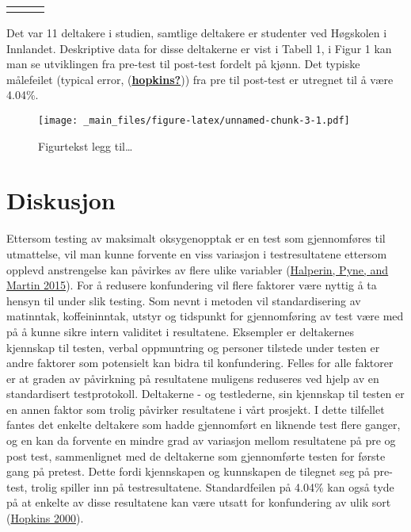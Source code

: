 \documentclass[
]{book}
\begin{document}
\begin{longtable}[c]{|p{1.08in}|p{1.02in}|p{1.02in}}
\noalign{\global\setlength{\arrayrulewidth}{2pt}}\arrayrulecolor[HTML]{666666}\cline{1-3}



\end{longtable}

Det var 11 deltakere i studien, samtlige deltakere er studenter ved
Høgskolen i Innlandet. Deskriptive data for disse deltakerne er vist i
Tabell 1, i Figur 1 kan man se utviklingen fra pre-test til post-test
fordelt på kjønn. Det typiske målefeilet (typical error,
(\protect\hyperlink{ref-hopkins}{\textbf{hopkins?}})) fra pre til
post-test er utregnet til å være 4.04\%.

\begin{figure}
\centering
\texttt{[image: \_main\_files/figure-latex/unnamed-chunk-3-1.pdf]}
\caption{Figurtekst legg til\ldots{}}
\end{figure}

\hypertarget{diskusjon}{%
\section{Diskusjon}\label{diskusjon}}

Ettersom testing av maksimalt oksygenopptak er en test som gjennomføres
til utmattelse, vil man kunne forvente en viss variasjon i
testresultatene ettersom opplevd anstrengelse kan påvirkes av flere
ulike variabler (\protect\hyperlink{ref-halperin2015}{Halperin, Pyne,
and Martin 2015}). For å redusere konfundering vil flere faktorer være
nyttig å ta hensyn til under slik testing. Som nevnt i metoden vil
standardisering av matinntak, koffeininntak, utstyr og tidspunkt for
gjennomføring av test være med på å kunne sikre intern validitet i
resultatene. Eksempler er deltakernes kjennskap til testen, verbal
oppmuntring og personer tilstede under testen er andre faktorer som
potensielt kan bidra til konfundering. Felles for alle faktorer er at
graden av påvirkning på resultatene muligens reduseres ved hjelp av en
standardisert testprotokoll. Deltakerne - og testlederne, sin kjennskap
til testen er en annen faktor som trolig påvirker resultatene i vårt
prosjekt. I dette tilfellet fantes det enkelte deltakere som hadde
gjennomført en liknende test flere ganger, og en kan da forvente en
mindre grad av variasjon mellom resultatene på pre og post test,
sammenlignet med de deltakerne som gjennomførte testen for første gang
på pretest. Dette fordi kjennskapen og kunnskapen de tilegnet seg på
pre-test, trolig spiller inn på testresultatene. Standardfeilen på
4.04\% kan også tyde på at enkelte av disse resultatene kan være utsatt
for konfundering av ulik sort
(\protect\hyperlink{ref-hopkins2000}{Hopkins 2000}).
\end{document}
